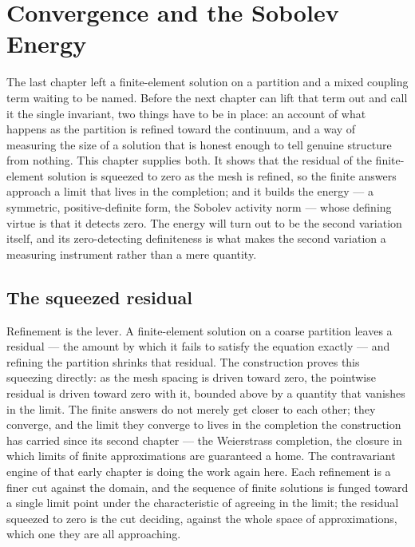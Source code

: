 \chapter{Convergence and the Sobolev Energy}
\label{chap:convergence-sobolev-energy}

The last chapter left a finite-element solution on a partition and a mixed coupling term waiting to be
named. Before the next chapter can lift that term out and call it the single invariant, two things have
to be in place: an account of what happens as the partition is refined toward the continuum, and a way
of measuring the size of a solution that is honest enough to tell genuine structure from nothing. This
chapter supplies both. It shows that the residual of the finite-element solution is squeezed to zero as
the mesh is refined, so the finite answers approach a limit that lives in the completion; and it builds
the energy --- a symmetric, positive-definite form, the Sobolev activity norm --- whose defining virtue
is that it detects zero. The energy will turn out to be the second variation itself, and its
zero-detecting definiteness is what makes the second variation a measuring instrument rather than a
mere quantity.

\section{The squeezed residual}
\label{se:the-squeezed-residual}

Refinement is the lever. A finite-element solution on a coarse partition leaves a residual --- the
amount by which it fails to satisfy the equation exactly --- and refining the partition shrinks that
residual. The construction proves this squeezing directly: as the mesh spacing is driven toward zero,
the pointwise residual is driven toward zero with it, bounded above by a quantity that vanishes in the
limit. The finite answers do not merely get closer to each other; they converge, and the limit they
converge to lives in the completion the construction has carried since its second chapter --- the
Weierstrass completion, the closure in which limits of finite approximations are guaranteed a home. The
contravariant engine of that early chapter is doing the work again here. Each refinement is a finer cut
against the domain, and the sequence of finite solutions is funged toward a single limit point under
the characteristic of agreeing in the limit; the residual squeezed to zero is the cut deciding, against
the whole space of approximations, which one they are all approaching.

